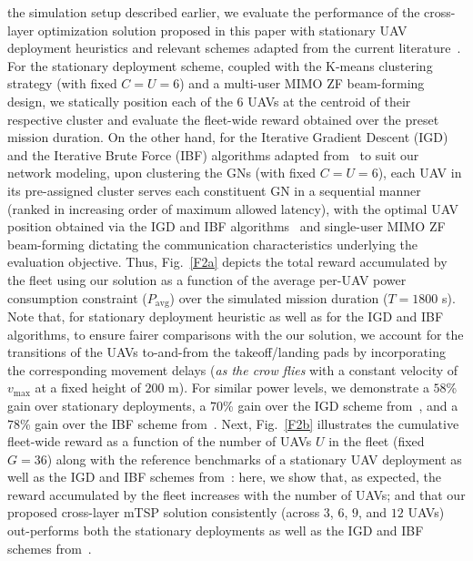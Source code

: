 \documentclass[10pt, twocolumn]{IEEEtran}
\begin{document}
 the simulation setup described earlier, we evaluate the performance of the cross-layer optimization solution proposed in this paper with stationary UAV deployment heuristics and relevant schemes adapted from the current literature~\cite{CORES_ICASSP}. For the stationary deployment scheme, coupled with the K-means clustering strategy (with fixed $C{=}U{=}6$) and a multi-user MIMO ZF beam-forming design, we statically position each of the $6$ UAVs at the centroid of their respective cluster and evaluate the fleet-wide reward obtained over the preset mission duration. On the other hand, for the Iterative Gradient Descent (IGD) and the Iterative Brute Force (IBF) algorithms adapted from~\cite{CORES_ICASSP} to suit our network modeling, upon clustering the GNs (with fixed $C{=}U{=}6$), each UAV in its pre-assigned cluster serves each constituent GN in a sequential manner (ranked in increasing order of maximum allowed latency), with the optimal UAV position obtained via the IGD and IBF algorithms~\cite{CORES_ICASSP} and single-user MIMO ZF beam-forming dictating the communication characteristics underlying the evaluation objective. Thus, Fig.~\ref{F2a} depicts the total reward accumulated by the fleet using our solution as a function of the average per-UAV power consumption constraint ($P_{\mathrm{avg}}$) over the simulated mission duration ($T{=}1800$ s). Note that, for stationary deployment heuristic as well as for the IGD and IBF algorithms, to ensure fairer comparisons with the our solution, we account for the transitions of the UAVs to-and-from the takeoff/landing pads by incorporating the corresponding movement delays (\emph{as the crow flies} with a constant velocity of $v_{\mathrm{max}}$ at a fixed height of $200$ m). For similar power levels, we demonstrate a $58$\% gain over stationary deployments, a $70$\% gain over the IGD scheme from~\cite{CORES_ICASSP}, and a $78$\% gain over the IBF scheme from~\cite{CORES_ICASSP}. Next, Fig.~\ref{F2b} illustrates the cumulative fleet-wide reward as a function of the number of UAVs $U$ in the fleet (fixed $G{=}36$) along with the reference benchmarks of a stationary UAV deployment as well as the IGD and IBF schemes from~\cite{CORES_ICASSP}: here, we show that, as expected, the reward accumulated by the fleet increases with the number of UAVs; and that our proposed cross-layer mTSP solution consistently (across $3$, $6$, $9$, and $12$ UAVs) out-performs both the stationary deployments as well as the IGD and IBF schemes from~\cite{CORES_ICASSP}.
\vspace{-3mm}
\end{document}
